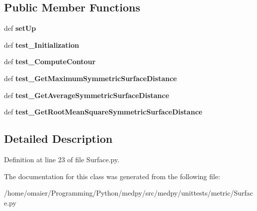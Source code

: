 \subsection*{Public Member Functions}
\begin{DoxyCompactItemize}
\item 
\hypertarget{classmedpy_1_1unittests_1_1metric_1_1Surface_1_1TestSurfaceClass_af6f10b41351cbd146f2af334e7a7c661}{
def {\bfseries setUp}}
\label{classmedpy_1_1unittests_1_1metric_1_1Surface_1_1TestSurfaceClass_af6f10b41351cbd146f2af334e7a7c661}

\item 
\hypertarget{classmedpy_1_1unittests_1_1metric_1_1Surface_1_1TestSurfaceClass_ae5faa8aa316ad7802013651f0b0d534d}{
def {\bfseries test\_\-Initialization}}
\label{classmedpy_1_1unittests_1_1metric_1_1Surface_1_1TestSurfaceClass_ae5faa8aa316ad7802013651f0b0d534d}

\item 
\hypertarget{classmedpy_1_1unittests_1_1metric_1_1Surface_1_1TestSurfaceClass_a030ba4445f3120543addea4788eba988}{
def {\bfseries test\_\-ComputeContour}}
\label{classmedpy_1_1unittests_1_1metric_1_1Surface_1_1TestSurfaceClass_a030ba4445f3120543addea4788eba988}

\item 
\hypertarget{classmedpy_1_1unittests_1_1metric_1_1Surface_1_1TestSurfaceClass_a1ed8d77fce82fea4ff666ee97294b9f1}{
def {\bfseries test\_\-GetMaximumSymmetricSurfaceDistance}}
\label{classmedpy_1_1unittests_1_1metric_1_1Surface_1_1TestSurfaceClass_a1ed8d77fce82fea4ff666ee97294b9f1}

\item 
\hypertarget{classmedpy_1_1unittests_1_1metric_1_1Surface_1_1TestSurfaceClass_a4b0285c8ac4cec38d8aded035d3e3e95}{
def {\bfseries test\_\-GetAverageSymmetricSurfaceDistance}}
\label{classmedpy_1_1unittests_1_1metric_1_1Surface_1_1TestSurfaceClass_a4b0285c8ac4cec38d8aded035d3e3e95}

\item 
\hypertarget{classmedpy_1_1unittests_1_1metric_1_1Surface_1_1TestSurfaceClass_af3f9d8b8f2d58af9f363be38b3a53e44}{
def {\bfseries test\_\-GetRootMeanSquareSymmetricSurfaceDistance}}
\label{classmedpy_1_1unittests_1_1metric_1_1Surface_1_1TestSurfaceClass_af3f9d8b8f2d58af9f363be38b3a53e44}

\end{DoxyCompactItemize}


\subsection{Detailed Description}


Definition at line 23 of file Surface.py.



The documentation for this class was generated from the following file:\begin{DoxyCompactItemize}
\item 
/home/omaier/Programming/Python/medpy/src/medpy/unittests/metric/Surface.py\end{DoxyCompactItemize}
